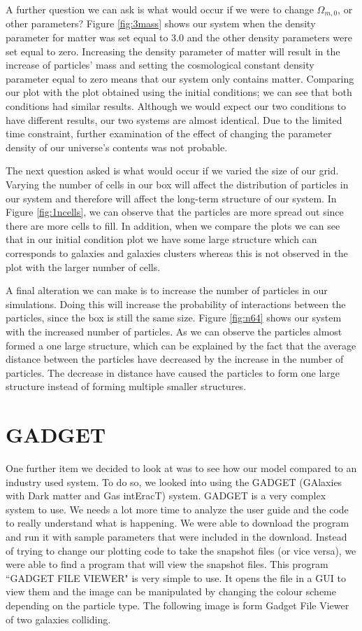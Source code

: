 \documentclass[10pt]{article}
\begin{document}
	A further question we can ask is what would occur if we were to change $\Omega_{m,0}$, or other parameters? Figure \ref{fig:3mass} shows our system when the density parameter for matter was set equal to 3.0 and the other density parameters were set equal to zero. Increasing the density parameter of matter will result in the increase of particles’ mass and setting the cosmological constant density parameter equal to zero means that our system only contains matter. Comparing our plot with the plot obtained using the initial conditions; we can see that both conditions had similar results. Although we would expect our two conditions to have different results, our two systems are almost identical. Due to the limited time constraint, further examination of the effect of changing the parameter density of our universe’s contents was not probable.   

	The next question asked is what would occur if we varied the size of our grid. Varying the number of cells in our box will affect the distribution of particles in our system and therefore will affect the long-term structure of our system. In Figure \ref{fig:1ncells}, we can observe that the particles are more spread out since there are more cells to fill. In addition, when we compare the plots we can see that in our initial condition plot we have some large structure which can corresponds to galaxies and galaxies clusters whereas this is not observed in the plot with the larger number of cells. 
	
	A final alteration we can make is to increase the number of particles in our simulations. Doing this will increase the probability of interactions between the particles, since the box is still the same size. Figure \ref{fig:n64} shows our system with the increased number of particles. As we can observe the particles almost formed a one large structure, which can be explained by the fact that the average distance between the particles have decreased by the increase in the number of particles. The decrease in distance have caused the particles to form one large structure instead of forming multiple smaller structures.   



\section{GADGET}
	One further item we decided to look at was to see how our model compared to an industry used system. To do so, we looked into using the GADGET (GAlaxies with Dark matter and Gas intEracT) system.
	GADGET is a very complex system to use. We needs a lot more time to analyze the user guide and the code to really understand what is happening. We were able to download the program and run it with sample parameters that were included in the download. Instead of trying to change our plotting code to take the snapshot files (or vice versa), we were able to find a program that will view the snapshot files. This program ``GADGET FILE VIEWER" is very simple to use. It opens the file in a GUI to view them and the image can be manipulated by changing the colour scheme depending on the particle type. The following image is form Gadget File Viewer of two galaxies colliding.
\end{document}
